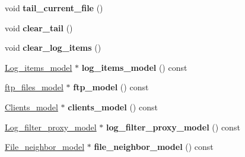 \begin{DoxyCompactItemize}
\item 
\hypertarget{class_log__viewer_1_1_log__manager_ad4e708d4dd51d2d5b99db98256065049}{void {\bfseries tail\-\_\-current\-\_\-file} ()}\label{class_log__viewer_1_1_log__manager_ad4e708d4dd51d2d5b99db98256065049}

\item 
\hypertarget{class_log__viewer_1_1_log__manager_ae5f7368756b825bb8a5c5e6e95447492}{void {\bfseries clear\-\_\-tail} ()}\label{class_log__viewer_1_1_log__manager_ae5f7368756b825bb8a5c5e6e95447492}

\item 
\hypertarget{class_log__viewer_1_1_log__manager_ac50136b21ddddda051a8a2c5f1fb119d}{void {\bfseries clear\-\_\-log\-\_\-items} ()}\label{class_log__viewer_1_1_log__manager_ac50136b21ddddda051a8a2c5f1fb119d}

\item 
\hypertarget{class_log__viewer_1_1_log__manager_a89032a90f8e174bf4e05692529243a65}{\hyperlink{class_log__viewer_1_1_log__items__model}{Log\-\_\-items\-\_\-model} $\ast$ {\bfseries log\-\_\-items\-\_\-model} () const }\label{class_log__viewer_1_1_log__manager_a89032a90f8e174bf4e05692529243a65}

\item 
\hypertarget{class_log__viewer_1_1_log__manager_a175cb3f91bbc5ba72db76e0fadfa1333}{\hyperlink{class_log__viewer_1_1ftp__files__model}{ftp\-\_\-files\-\_\-model} $\ast$ {\bfseries ftp\-\_\-model} () const }\label{class_log__viewer_1_1_log__manager_a175cb3f91bbc5ba72db76e0fadfa1333}

\item 
\hypertarget{class_log__viewer_1_1_log__manager_a10c36541f43e869bdd236ee0b9314dc4}{\hyperlink{class_log__viewer_1_1_clients__model}{Clients\-\_\-model} $\ast$ {\bfseries clients\-\_\-model} () const }\label{class_log__viewer_1_1_log__manager_a10c36541f43e869bdd236ee0b9314dc4}

\item 
\hypertarget{class_log__viewer_1_1_log__manager_a604214baff8422513b56b9d250021fc9}{\hyperlink{class_log__viewer_1_1_log__filter__proxy__model}{Log\-\_\-filter\-\_\-proxy\-\_\-model} $\ast$ {\bfseries log\-\_\-filter\-\_\-proxy\-\_\-model} () const }\label{class_log__viewer_1_1_log__manager_a604214baff8422513b56b9d250021fc9}

\item 
\hypertarget{class_log__viewer_1_1_log__manager_a5679b9477da66227847ad81996184c57}{\hyperlink{class_log__viewer_1_1_file__neighbor__model}{File\-\_\-neighbor\-\_\-model} $\ast$ {\bfseries file\-\_\-neighbor\-\_\-model} () const }\label{class_log__viewer_1_1_log__manager_a5679b9477da66227847ad81996184c57}


\end{DoxyCompactItemize}
